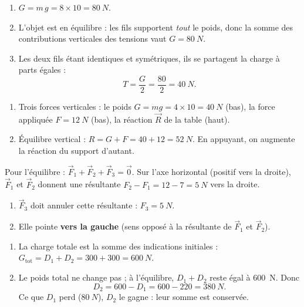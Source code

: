 \documentclass[11pt,a4paper]{article}
\newcommand{\vv}[1]{\vec{#1}}\newcommand{\ds}{\displaystyle}
\begin{document}
\begin{corrige}
\begin{enumerate}[label=\alph*)]
  \item $G = m\,g = 8\times 10 = \qty{80}{N}$.
  \item L'objet est en équilibre : les fils supportent \emph{tout} le poids, donc la somme des
        contributions verticales des tensions vaut $G=\qty{80}{N}$.
  \item Les deux fils étant identiques et symétriques, ils se partagent la charge à parts égales :
        \[ T = \frac{G}{2} = \frac{80}{2} = \qty{40}{N}. \]
\end{enumerate}
\end{corrige}

\begin{corrige}
\begin{enumerate}[label=\alph*)]
  \item Trois forces verticales : le poids $G=m g=4\times 10=\qty{40}{N}$ (bas), la force appliquée
        $F=\qty{12}{N}$ (bas), la réaction $\vv R$ de la table (haut).
  \item Équilibre vertical : $R = G + F = 40 + 12 = \qty{52}{N}$. En appuyant, on augmente la
        réaction du support d'autant.
\end{enumerate}
\end{corrige}

\begin{corrige}
Pour l'équilibre : $\vv F_1+\vv F_2+\vv F_3=\vv 0$. Sur l'axe horizontal (positif vers la droite),
$\vv F_1$ et $\vv F_2$ donnent une résultante $F_2-F_1 = 12-7 = \qty{5}{N}$ vers la droite.
\begin{enumerate}[label=\alph*)]
  \item $\vv F_3$ doit annuler cette résultante : $F_3 = \qty{5}{N}$.
  \item Elle pointe \textbf{vers la gauche} (sens opposé à la résultante de $\vv F_1$ et $\vv F_2$).
\end{enumerate}
\end{corrige}

\begin{corrige}
\begin{enumerate}[label=\alph*)]
  \item La charge totale est la somme des indications initiales :
        $G_{\text{tot}} = D_1 + D_2 = 300 + 300 = \qty{600}{N}$.
  \item Le poids total ne change pas ; à l'équilibre, $D_1+D_2$ reste égal à \qty{600}{N}. Donc
        \[ D_2 = 600 - D_1 = 600 - 220 = \qty{380}{N}. \]
        Ce que $D_1$ perd ($\qty{80}{N}$), $D_2$ le gagne : leur somme est conservée.
\end{enumerate}
\end{corrige}
\end{document}
